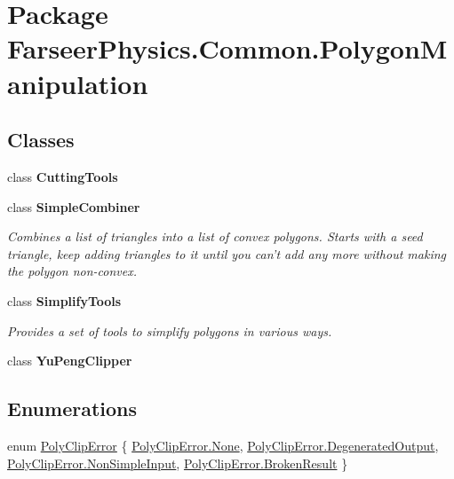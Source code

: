 \hypertarget{namespace_farseer_physics_1_1_common_1_1_polygon_manipulation}{\section{Package Farseer\+Physics.\+Common.\+Polygon\+Manipulation}
\label{namespace_farseer_physics_1_1_common_1_1_polygon_manipulation}
}
\subsection*{Classes}
\begin{DoxyCompactItemize}
\item 
class {\bfseries Cutting\+Tools}
\item 
class {\bfseries Simple\+Combiner}
\begin{DoxyCompactList}\small\item\em Combines a list of triangles into a list of convex polygons. Starts with a seed triangle, keep adding triangles to it until you can't add any more without making the polygon non-\/convex. \end{DoxyCompactList}\item 
class {\bfseries Simplify\+Tools}
\begin{DoxyCompactList}\small\item\em Provides a set of tools to simplify polygons in various ways. \end{DoxyCompactList}\item 
class {\bfseries Yu\+Peng\+Clipper}
\end{DoxyCompactItemize}
\subsection*{Enumerations}
\begin{DoxyCompactItemize}
\item 
enum \hyperlink{namespace_farseer_physics_1_1_common_1_1_polygon_manipulation_a1b9a3408cd322ec7e46098324793b5d5}{Poly\+Clip\+Error} \{ \hyperlink{namespace_farseer_physics_1_1_common_1_1_polygon_manipulation_a1b9a3408cd322ec7e46098324793b5d5a6adf97f83acf6453d4a6a4b1070f3754}{Poly\+Clip\+Error.\+None}, 
\hyperlink{namespace_farseer_physics_1_1_common_1_1_polygon_manipulation_a1b9a3408cd322ec7e46098324793b5d5ad292f634700e4b9ca3f5a35372d22e6f}{Poly\+Clip\+Error.\+Degenerated\+Output}, 
\hyperlink{namespace_farseer_physics_1_1_common_1_1_polygon_manipulation_a1b9a3408cd322ec7e46098324793b5d5a12b4f2335c258d659ce17a8d14b8693f}{Poly\+Clip\+Error.\+Non\+Simple\+Input}, 
\hyperlink{namespace_farseer_physics_1_1_common_1_1_polygon_manipulation_a1b9a3408cd322ec7e46098324793b5d5aa869e0bf0957ca8c26ff2c88e1271abc}{Poly\+Clip\+Error.\+Broken\+Result}
 \}
\end{DoxyCompactItemize}



